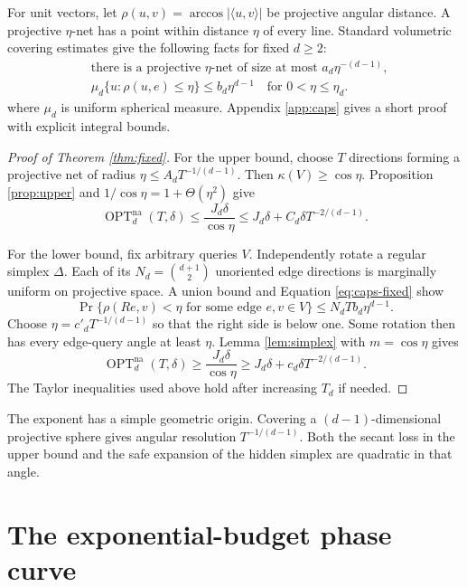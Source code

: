 \documentclass{article}
\newcommand{\ip}[2]{\langle #1,#2\rangle}
\newcommand{\OPT}{\operatorname{OPT}}
\newcommand{\na}{\mathrm{na}}
\theoremstyle{definition}
\begin{document}
For unit vectors, let $\rho(u,v)=\arccos|\ip{u}{v}|$ be projective angular distance.  A projective $\eta$-net has a point within distance $\eta$ of every line.  Standard volumetric covering estimates give the following facts for fixed $d\geq2$:
\begin{equation}
 \begin{split}
 &\text{there is a projective $\eta$-net of size at most }
       a_d\eta^{-(d-1)},\\
 &\mu_d\{u:\rho(u,e)\leq\eta\}
       \leq b_d\eta^{d-1}\quad\text{for }0<\eta\leq\eta_d.
                                                               \label{eq:caps-fixed}
 \end{split}
\end{equation}
where $\mu_d$ is uniform spherical measure.  Appendix \ref{app:caps} gives a short proof with explicit integral bounds.

\begin{proof}[Proof of Theorem \ref{thm:fixed}]
For the upper bound, choose $T$ directions forming a projective net of radius $\eta\leq A_dT^{-1/(d-1)}$.  Then $\kappa(V)\geq\cos\eta$.  Proposition \ref{prop:upper} and $1/\cos\eta=1+\Theta(\eta^2)$ give \[ \OPT^{\na}_d(T,\delta) \leq \frac{J_d\delta}{\cos\eta} \leq J_d\delta+C_d\delta T^{-2/(d-1)}. \]

For the lower bound, fix arbitrary queries $V$.  Independently rotate a regular simplex $\Delta$.  Each of its $N_d=\binom{d+1}{2}$ unoriented edge directions is marginally uniform on projective space.  A union bound and Equation \eqref{eq:caps-fixed} show \[ \Pr\big\{\rho(Re,v)<\eta\text{ for some edge }e,v\in V\big\} \leq N_dTb_d\eta^{d-1}. \] Choose $\eta=c'_dT^{-1/(d-1)}$ so that the right side is below one. Some rotation then has every edge-query angle at least $\eta$.  Lemma \ref{lem:simplex} with $m=\cos\eta$ gives \[ \OPT^{\na}_d(T,\delta) \geq\frac{J_d\delta}{\cos\eta} \geq J_d\delta+c_d\delta T^{-2/(d-1)}. \] The Taylor inequalities used above hold after increasing $T_d$ if needed.
\end{proof}

The exponent has a simple geometric origin.  Covering a $(d-1)$-dimensional projective sphere gives angular resolution $T^{-1/(d-1)}$.  Both the secant loss in the upper bound and the safe expansion of the hidden simplex are quadratic in that angle.

\section{The exponential-budget phase curve}                       \label{sec:phase}
\end{document}
